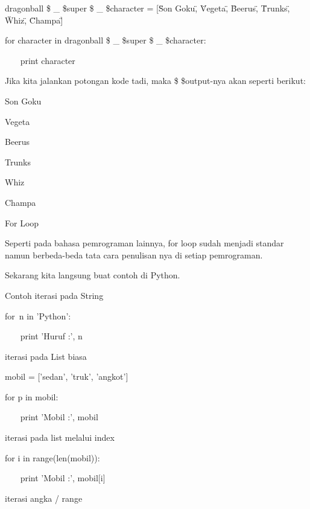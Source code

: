 \vspace{12pt}
dragonball \$  \_  \$super \$  \_  \$character = [\"Son Goku\", \"Vegeta\", \"Beerus\", \"Trunks\", \"Whiz\", \"Champa\"] \par
for character in dragonball \$  \_  \$super \$  \_  \$character: \par
~~~ print character \par
\vspace{12pt}
Jika kita jalankan potongan kode tadi, maka \$  \$output-nya akan seperti berikut: \par
\vspace{12pt}
Son Goku \par
Vegeta \par
Beerus \par
Trunks \par
Whiz \par
Champa \par
For Loop \par
Seperti pada bahasa pemrograman lainnya, for loop sudah menjadi standar namun berbeda-beda tata cara penulisan nya di setiap pemrograman. \par
\vspace{12pt}
Sekarang kita langsung buat contoh di Python. $  $ \par
\vspace{12pt}
\vspace{12pt}
Contoh iterasi pada String  \par
\vspace{12pt}
for~n in 'Python':   \par
~~~ print 'Huruf :', n \par
\vspace{12pt}
  \par
iterasi pada List biasa \par
\vspace{12pt}
mobil = ['sedan', 'truk', 'angkot']  \par
for p in mobil: \par
~~~ print 'Mobil :', mobil \par
\vspace{12pt}
\vspace{12pt}
iterasi pada list melalui index \par
for i in range(len(mobil)): \par
~~~ print 'Mobil :', mobil[i] \par
\vspace{12pt}
iterasi angka / range \par
\vspace{12pt}
